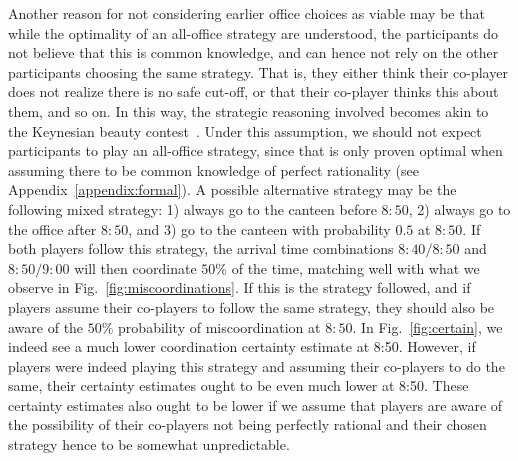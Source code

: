 \documentclass[twocolumn,a4paper,superscriptaddress,nofootinbib]{revtex4}
\begin{document}
Another reason for not considering earlier office choices as viable may be that while the optimality of an all-office strategy are understood, the participants do not believe that this is common knowledge, and can hence not rely on the other participants choosing the same strategy. That is, they either think their co-player does not realize there is no safe cut-off, or that their co-player thinks this about them, and so on. In this way, the strategic reasoning involved becomes akin to the Keynesian beauty contest~\cite{keynes1936general,nagel1995unraveling}. Under this assumption, we should not expect participants to play an all-office strategy, since that is only proven optimal when assuming there to be common knowledge of perfect rationality (see Appendix~\ref{appendix:formal}). A possible alternative strategy may be the following mixed strategy: 1) always go to the canteen before $8{:}50$, 2) always go to the office after $8{:}50$, and 3) go to the canteen with probability $0.5$ at $8{:}50$. If both players follow this strategy, the arrival time combinations $8{:}40/8{:}50$ and $8{:}50/9{:}00$ will then coordinate $50\%$ of the time, matching well with what we observe in Fig.~\ref{fig:miscoordinations}. If this is the strategy followed, and if players assume their co-players to follow the same strategy, they should also be aware of the $50\%$ probability of miscoordination at $8{:}50$. In Fig.~\ref{fig:certain}, we indeed see a much lower coordination certainty estimate at 8:50. However, if players were indeed playing this strategy and assuming their co-players to do the same, their certainty estimates ought to be even much lower at 8{:}50. These certainty estimates also ought to be lower if we assume that players are aware of the possibility of their co-players not being perfectly rational and their chosen strategy hence to be somewhat unpredictable. 
\end{document}
